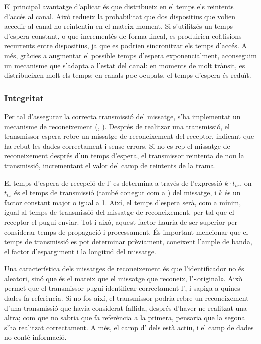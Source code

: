\documentclass{tfgitic}[2024/07/01]
\begin{document}
El principal avantatge d'aplicar  és que distribueix en el temps els reintents d'accés al canal. Això redueix la probabilitat que dos dispositius que volien accedir al canal ho reintentin en el mateix moment. Si s'utilitzés un temps d'espera constant, o que incrementés de forma lineal, es produirien co\l.lisions recurrents entre dispositius, ja que es podrien sincronitzar els temps d'accés. A més, gràcies a augmentar el possible temps d'espera exponencialment, aconseguim un mecanisme que s'adapta a l'estat del canal: en moments de molt trànsit, es distribueixen molt els temps; en canals poc ocupats, el temps d'espera és reduït.
\subsubsection{Integritat}
\label{subsubsec:integritat}
Per tal d'assegurar la correcta transmissió del missatge, s'ha implementat un mecanisme de reconeixement (, ). Després de realitzar una transmissió, el transmissor espera rebre un missatge de reconeixement del receptor, indicant que ha rebut les dades correctament i sense errors. Si no es rep el missatge de reconeixement després d'un temps d'espera, el transmissor reintenta de nou la transmissió, incrementant el valor del camp de reintents de la trama.

El temps d'espera de recepció de l' es determina a través de l'expressió $k \cdot t_{tx}$, on $t_{tx}$ és el temps de transmissió (també conegut com a ) del missatge, i $k$ és un factor constant major o igual a 1. Així, el temps d'espera serà, com a mínim, igual al temps de transmissió del missatge de reconeixement, per tal que el receptor el pugui enviar. Tot i això, aquest factor hauria de ser superior per considerar temps de propagació i processament. És important mencionar que el temps de transmissió es pot determinar prèviament, coneixent l'ample de banda, el factor d'espargiment i la longitud del missatge.

Una característica dels missatges de reconeixement és que l'identificador no és aleatori, sinó que és el mateix que el missatge que reconeix, l'«original». Això permet que el transmissor pugui identificar correctament l', i sapiga a quines dades fa referència. Si no fos així, el transmissor podria rebre un reconeixement d'una transmissió que havia considerat fallida, després d'haver-ne realitzat una altra; com que no sabria que fa referència a la primera, pensaria que la segona s'ha realitzat correctament. A més, el camp d' dels  està actiu, i el camp de dades no conté informació.
\end{document}
